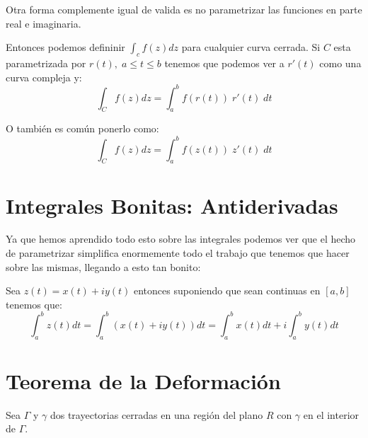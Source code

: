 \documentclass[12pt, fleqn]{report}                             %
\begin{document}
                Otra forma complemente igual de valida es no parametrizar las funciones
                en parte real e imaginaria.

                Entonces podemos defininir $\int_c f(z)dz$ para cualquier curva
                cerrada. Si $C$ esta parametrizada por $r(t), \; a \leq t \leq b$
                tenemos que podemos ver a $r'(t)$ como una curva compleja y:
                \begin{equation*}
                    \int_C f(z) dz = \int_a^b f(r(t)) \; r'(t) \; dt
                \end{equation*}

                O también es común ponerlo como:
                \begin{equation*}
                    \int_C f(z) dz = \int_a^b f(z(t)) \; z'(t) \; dt
                \end{equation*}


        \section{Integrales Bonitas: Antiderivadas}

            Ya que hemos aprendido todo esto sobre las integrales podemos ver que el hecho
            de parametrizar simplifica enormemente todo el trabajo que tenemos que hacer sobre
            las mismas, llegando a esto tan bonito:

            Sea $z(t) = x(t) + iy(t)$ entonces suponiendo que sean continuas en $[a,b]$
            tenemos que:
            \begin{equation*}
                \int_a^b z(t) dt 
                    = \int_a^b (x(t) + iy(t))dt
                    = \int_a^b x(t)dt + i\int_a^b y(t)dt
            \end{equation*}



        \section{Teorema de la Deformación}

            Sea $\Gamma$ y $\gamma$ dos trayectorias cerradas en una región del plano $R$
            con $\gamma$ en el interior de $\Gamma$.
\end{document}
